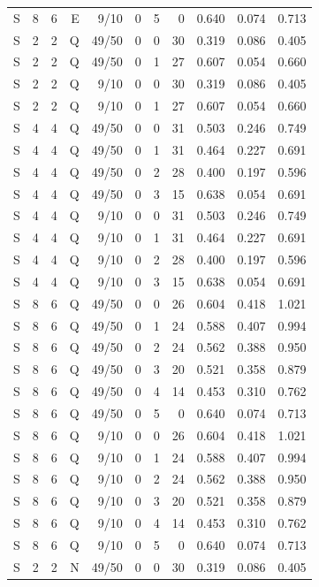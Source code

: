\begin{longtable}{rrrrrrrrrrr}
S & 8 & 6 & E & 9/10 & 0 & 5 & 0 & 0.640 & 0.074 & 0.713 \\
S & 2 & 2 & Q & 49/50 & 0 & 0 & 30 & 0.319 & 0.086 & 0.405 \\
S & 2 & 2 & Q & 49/50 & 0 & 1 & 27 & 0.607 & 0.054 & 0.660 \\
S & 2 & 2 & Q & 9/10 & 0 & 0 & 30 & 0.319 & 0.086 & 0.405 \\
S & 2 & 2 & Q & 9/10 & 0 & 1 & 27 & 0.607 & 0.054 & 0.660 \\
S & 4 & 4 & Q & 49/50 & 0 & 0 & 31 & 0.503 & 0.246 & 0.749 \\
S & 4 & 4 & Q & 49/50 & 0 & 1 & 31 & 0.464 & 0.227 & 0.691 \\
S & 4 & 4 & Q & 49/50 & 0 & 2 & 28 & 0.400 & 0.197 & 0.596 \\
S & 4 & 4 & Q & 49/50 & 0 & 3 & 15 & 0.638 & 0.054 & 0.691 \\
S & 4 & 4 & Q & 9/10 & 0 & 0 & 31 & 0.503 & 0.246 & 0.749 \\
S & 4 & 4 & Q & 9/10 & 0 & 1 & 31 & 0.464 & 0.227 & 0.691 \\
S & 4 & 4 & Q & 9/10 & 0 & 2 & 28 & 0.400 & 0.197 & 0.596 \\
S & 4 & 4 & Q & 9/10 & 0 & 3 & 15 & 0.638 & 0.054 & 0.691 \\
S & 8 & 6 & Q & 49/50 & 0 & 0 & 26 & 0.604 & 0.418 & 1.021 \\
S & 8 & 6 & Q & 49/50 & 0 & 1 & 24 & 0.588 & 0.407 & 0.994 \\
S & 8 & 6 & Q & 49/50 & 0 & 2 & 24 & 0.562 & 0.388 & 0.950 \\
S & 8 & 6 & Q & 49/50 & 0 & 3 & 20 & 0.521 & 0.358 & 0.879 \\
S & 8 & 6 & Q & 49/50 & 0 & 4 & 14 & 0.453 & 0.310 & 0.762 \\
S & 8 & 6 & Q & 49/50 & 0 & 5 & 0 & 0.640 & 0.074 & 0.713 \\
S & 8 & 6 & Q & 9/10 & 0 & 0 & 26 & 0.604 & 0.418 & 1.021 \\
S & 8 & 6 & Q & 9/10 & 0 & 1 & 24 & 0.588 & 0.407 & 0.994 \\
S & 8 & 6 & Q & 9/10 & 0 & 2 & 24 & 0.562 & 0.388 & 0.950 \\
S & 8 & 6 & Q & 9/10 & 0 & 3 & 20 & 0.521 & 0.358 & 0.879 \\
S & 8 & 6 & Q & 9/10 & 0 & 4 & 14 & 0.453 & 0.310 & 0.762 \\
S & 8 & 6 & Q & 9/10 & 0 & 5 & 0 & 0.640 & 0.074 & 0.713 \\
S & 2 & 2 & N & 49/50 & 0 & 0 & 30 & 0.319 & 0.086 & 0.405 \\

\end{longtable}
